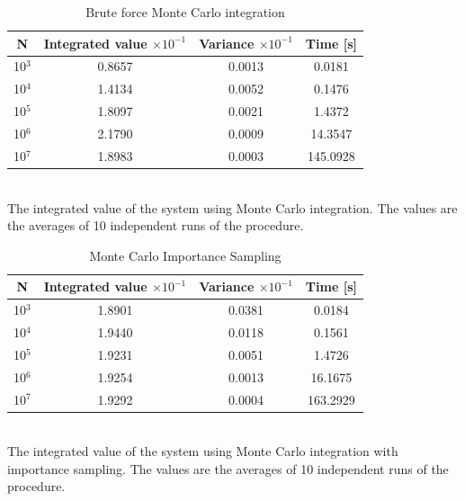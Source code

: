 \documentclass[%
reprint,nofootinbib,
amsmath,amssymb,
aps,
]{revtex4-1}
\begin{document}
\begin{table}[!h]
	\caption{Brute force Monte Carlo integration}
	\begin{tabular}{|c|c|c|c|}
		\hline 
		\hspace{5mm} \textbf{N} \hspace{5mm} & \textbf{Integrated value} $\times 10^{-1}$& \hspace{3mm} \textbf{Variance} $\times 10^{-1}$ & \hspace{3mm} \textbf{Time  [s]} \hspace{5mm}\\
		\hline 
			10$^3$ & 0.8657  & 0.0013  & 0.0181 \\
			10$^4$  & 1.4134  & 0.0052  & 0.1476 \\
			10$^5$  & 1.8097  & 0.0021  & 1.4372 \\
			10$^6$  & 2.1790  & 0.0009  & 14.3547 \\
			10$^7$  & 1.8983  & 0.0003  & 145.0928 \\
		\hline 
	\end{tabular} \\ [3pt]
	\label{mc_values} \centering The integrated value of the system using Monte Carlo integration. The values are the averages of 10 independent runs of the procedure. 
\end{table}


\begin{table}[!h]
	\caption{Monte Carlo Importance Sampling}
	\begin{tabular}{|c|c|c|c|}
		\hline 
		\hspace{5mm} \textbf{N} \hspace{5mm} & \textbf{Integrated value} $\times 10^{-1}$& \hspace{3mm} \textbf{Variance}  $\times 10^{-1}$& \hspace{3mm} \textbf{Time  [s]} \hspace{5mm}\\
		\hline 
			10$^3$ & 1.8901  & 0.0381  & 0.0184 \\
			10$^4$ & 1.9440  & 0.0118  & 0.1561 \\
			10$^5$ & 1.9231  & 0.0051  & 1.4726 \\
			10$^6$ & 1.9254  & 0.0013  & 16.1675 \\
			10$^7$ & 1.9292  & 0.0004  & 163.2929 \\

		\hline 
	\end{tabular} \\ 
	[3pt]\label{mc_values_is} \centering The integrated value of the system using Monte Carlo integration with importance sampling. The values are the averages of 10 independent runs of the procedure.
\end{table}
\end{document}
